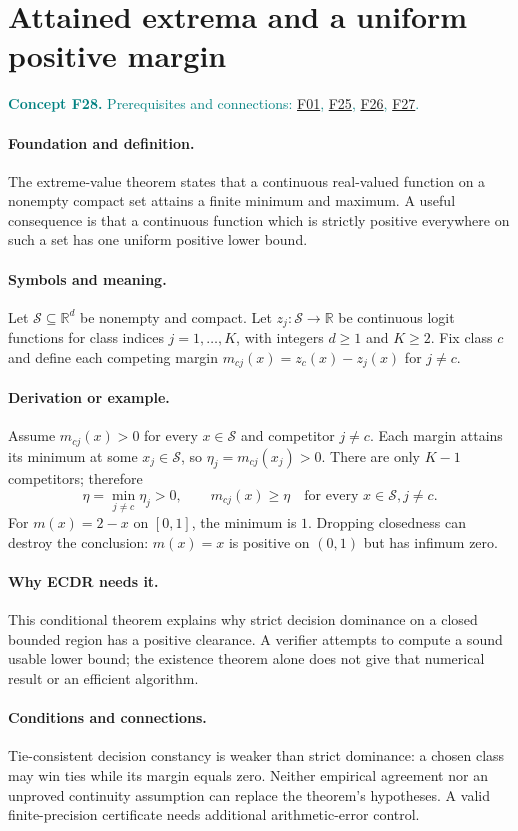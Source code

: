 \documentclass[11pt,a4paper]{article}
\newcommand{\R}{\mathbb R}
\newcommand{\conceptid}{Front matter}
\newcommand{\concept}[3]{\clearpage\renewcommand{\conceptid}{#1}%
\section{#2}\label{concept:#1}%
\textcolor{teal}{\textbf{Concept #1.} Prerequisites and connections: #3.}\par
\typeout{ECDR-CONCEPT-START #1 PAGE=\thepage}}
\begin{document}
\concept{F28}{Attained extrema and a uniform positive margin}{\hyperref[concept:F01]{F01}, \hyperref[concept:F25]{F25}, \hyperref[concept:F26]{F26}, \hyperref[concept:F27]{F27}}
\paragraph{Foundation and definition.}
The extreme-value theorem states that a continuous real-valued function
on a nonempty compact set attains a finite minimum and maximum. A useful
consequence is that a continuous function which is strictly positive
everywhere on such a set has one uniform positive lower bound.
\paragraph{Symbols and meaning.}
Let $\mathcal S\subseteq\R^d$ be nonempty and compact. Let
$z_j:\mathcal S\to\R$ be continuous logit functions for class
indices $j=1,\ldots,K$, with integers $d\ge1$ and $K\ge2$.
Fix class $c$ and define each competing margin
$m_{cj}(x)=z_c(x)-z_j(x)$ for $j\ne c$.
\paragraph{Derivation or example.}
Assume $m_{cj}(x)>0$ for every $x\in\mathcal S$ and competitor
$j\ne c$. Each margin attains its minimum at some
$x_j\in\mathcal S$, so $\eta_j=m_{cj}(x_j)>0$. There are only
$K-1$ competitors; therefore
\[
 \eta=\min_{j\ne c}\eta_j>0,
 \qquad m_{cj}(x)\ge\eta
 \quad\text{for every }x\in\mathcal S, j\ne c.
\]
For $m(x)=2-x$ on $[0,1]$, the minimum is $1$. Dropping closedness
can destroy the conclusion: $m(x)=x$ is positive on $(0,1)$ but has
infimum zero.
\paragraph{Why ECDR needs it.}
This conditional theorem explains why strict decision dominance on a
closed bounded region has a positive clearance. A verifier attempts to
compute a sound usable lower bound; the existence theorem alone does
not give that numerical result or an efficient algorithm.
\paragraph{Conditions and connections.}
Tie-consistent decision constancy is weaker than strict dominance: a
chosen class may win ties while its margin equals zero. Neither
empirical agreement nor an unproved continuity assumption can replace
the theorem's hypotheses. A valid finite-precision certificate needs
additional arithmetic-error control.
\par\label{endconcept:F28}
\end{document}
